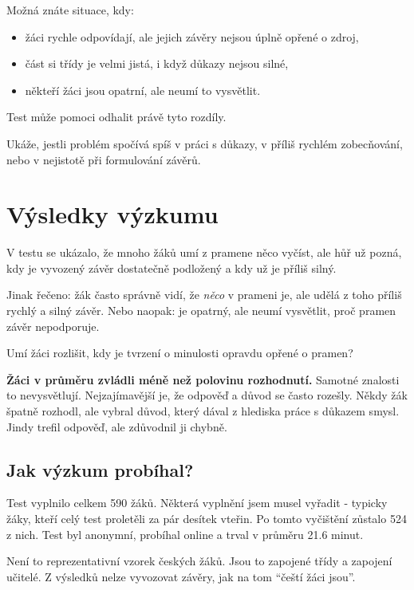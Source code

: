 \documentclass[
  12pt,
  english,
  a4paper,
  extrafontsizes,onecolumn,openright
  ]{memoir}
\providecommand{\tightlist}{%
  \setlength{\itemsep}{0pt}\setlength{\parskip}{0pt}}
\begin{document}
Možná znáte situace, kdy:

\begin{itemize}
\tightlist
\item
  žáci rychle odpovídají, ale jejich závěry nejsou úplně opřené o zdroj,
\item
  část si třídy je velmi jistá, i když důkazy nejsou silné,
\item
  někteří žáci jsou opatrní, ale neumí to vysvětlit.
\end{itemize}

Test může pomoci odhalit právě tyto rozdíly.

Ukáže, jestli problém spočívá spíš v práci s důkazy, v příliš rychlém zobecňování, nebo v nejistotě při formulování závěrů.

\section{Výsledky výzkumu}\label{vuxfdsledky-vuxfdzkumu-1}

V testu se ukázalo, že mnoho žáků umí z pramene něco vyčíst, ale hůř už
pozná, kdy je vyvozený závěr dostatečně podložený a kdy už je příliš silný.

Jinak řečeno: žák často správně vidí, že \emph{něco} v prameni je, ale udělá z toho
příliš rychlý a silný závěr. Nebo naopak: je opatrný, ale neumí vysvětlit, proč
pramen závěr nepodporuje.

Umí žáci rozlišit, kdy je tvrzení o minulosti opravdu opřené o pramen?

\textbf{Žáci v průměru zvládli méně než polovinu rozhodnutí.} Samotné
znalosti to nevysvětlují. Nejzajímavější je, že odpověď
a důvod se často rozešly. Někdy žák špatně rozhodl, ale vybral důvod,
který dával z hlediska práce s důkazem smysl. Jindy trefil odpověď, ale
zdůvodnil ji chybně.

\scriptsize

\normalsize

\subsection{Jak výzkum probíhal?}\label{jak-vuxfdzkum-probuxedhal-1}

Test vyplnilo celkem 590 žáků. Některá vyplnění jsem musel
vyřadit - typicky žáky, kteří celý test proletěli za pár desítek vteřin. Po tomto
vyčištění zůstalo 524 z nich. Test byl anonymní, probíhal online a
trval v průměru 21.6 minut.

Není to reprezentativní vzorek českých žáků. Jsou to zapojené třídy a
zapojení učitelé. Z výsledků nelze vyvozovat závěry, jak na tom \enquote{čeští žáci jsou}.
\end{document}
